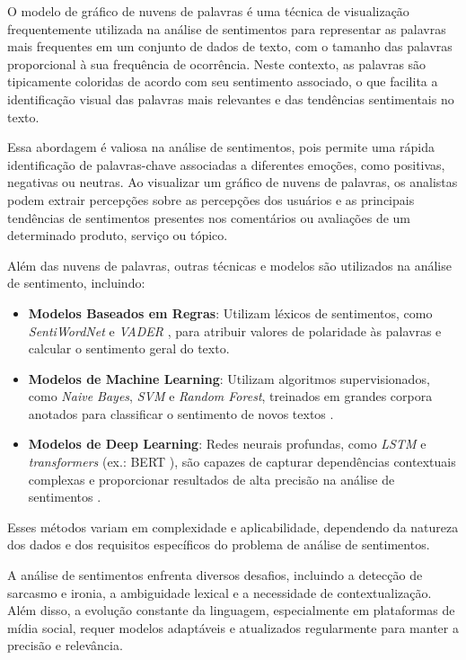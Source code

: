O modelo de gráfico de nuvens de palavras é uma técnica de visualização frequentemente utilizada na análise de sentimentos para representar as palavras mais frequentes em um conjunto de dados de texto, com o tamanho das palavras proporcional à sua frequência de ocorrência. Neste contexto, as palavras são tipicamente coloridas de acordo com seu sentimento associado, o que facilita a identificação visual das palavras mais relevantes e das tendências sentimentais no texto.

Essa abordagem é valiosa na análise de sentimentos, pois permite uma rápida identificação de palavras-chave associadas a diferentes emoções, como positivas, negativas ou neutras. Ao visualizar um gráfico de nuvens de palavras, os analistas podem extrair percepções sobre as percepções dos usuários e as principais tendências de sentimentos presentes nos comentários ou avaliações de um determinado produto, serviço ou tópico.

Além das nuvens de palavras, outras técnicas e modelos são utilizados na análise de sentimento, incluindo:

\begin{itemize}
    \item \textbf{Modelos Baseados em Regras}: Utilizam léxicos de sentimentos, como \textit{SentiWordNet} \cite{Baccianella2010} e \textit{VADER} \cite{Hutto2014}, para atribuir valores de polaridade às palavras e calcular o sentimento geral do texto.
    \item \textbf{Modelos de Machine Learning}: Utilizam algoritmos supervisionados, como \textit{Naive Bayes}, \textit{SVM} e \textit{Random Forest}, treinados em grandes corpora anotados para classificar o sentimento de novos textos \cite{Pang2002, Liu2012}.
    \item \textbf{Modelos de Deep Learning}: Redes neurais profundas, como \textit{LSTM} e \textit{transformers} (ex.: BERT \cite{Devlin2019}), são capazes de capturar dependências contextuais complexas e proporcionar resultados de alta precisão na análise de sentimentos \cite{Zhang2018}.
\end{itemize}

Esses métodos variam em complexidade e aplicabilidade, dependendo da natureza dos dados e dos requisitos específicos do problema de análise de sentimentos.

A análise de sentimentos enfrenta diversos desafios, incluindo a detecção de sarcasmo e ironia, a ambiguidade lexical e a necessidade de contextualização. Além disso, a evolução constante da linguagem, especialmente em plataformas de mídia social, requer modelos adaptáveis e atualizados regularmente para manter a precisão e relevância.


